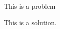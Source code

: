 \documentclass[]{worksheet}
\begin{document}
\begin{problem}
This is a problem
\end{problem}

\begin{solution}
This is a solution.
\end{solution}
\end{document}
